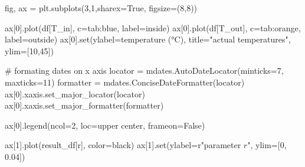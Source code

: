 \documentclass[
  letterpaper,
  DIV=11,
  numbers=noendperiod,
  oneside]{scrreprt}
\newenvironment{Shaded}{\begin{snugshade}}{\end{snugshade}}
\newcommand{\BuiltInTok}[1]{\textcolor[rgb]{0.00,0.23,0.31}{#1}}
\newcommand{\CommentTok}[1]{\textcolor[rgb]{0.37,0.37,0.37}{#1}}
\newcommand{\DecValTok}[1]{\textcolor[rgb]{0.68,0.00,0.00}{#1}}
\newcommand{\FloatTok}[1]{\textcolor[rgb]{0.68,0.00,0.00}{#1}}
\newcommand{\NormalTok}[1]{\textcolor[rgb]{0.00,0.23,0.31}{#1}}
\newcommand{\OperatorTok}[1]{\textcolor[rgb]{0.37,0.37,0.37}{#1}}
\newcommand{\StringTok}[1]{\textcolor[rgb]{0.13,0.47,0.30}{#1}}
\newcommand{\VariableTok}[1]{\textcolor[rgb]{0.07,0.07,0.07}{#1}}
\newcommand{\VerbatimStringTok}[1]{\textcolor[rgb]{0.13,0.47,0.30}{#1}}
\begin{document}
\begin{Shaded}
\begin{Highlighting}[]
\NormalTok{fig, ax }\OperatorTok{=}\NormalTok{ plt.subplots(}\DecValTok{3}\NormalTok{,}\DecValTok{1}\NormalTok{,sharex}\OperatorTok{=}\VariableTok{True}\NormalTok{, figsize}\OperatorTok{=}\NormalTok{(}\DecValTok{8}\NormalTok{,}\DecValTok{8}\NormalTok{))}

\NormalTok{ax[}\DecValTok{0}\NormalTok{].plot(df[}\StringTok{\textquotesingle{}T\_in\textquotesingle{}}\NormalTok{], c}\OperatorTok{=}\StringTok{\textquotesingle{}tab:blue\textquotesingle{}}\NormalTok{, label}\OperatorTok{=}\StringTok{\textquotesingle{}inside\textquotesingle{}}\NormalTok{)}
\NormalTok{ax[}\DecValTok{0}\NormalTok{].plot(df[}\StringTok{\textquotesingle{}T\_out\textquotesingle{}}\NormalTok{], c}\OperatorTok{=}\StringTok{\textquotesingle{}tab:orange\textquotesingle{}}\NormalTok{, label}\OperatorTok{=}\StringTok{\textquotesingle{}outside\textquotesingle{}}\NormalTok{)}
\NormalTok{ax[}\DecValTok{0}\NormalTok{].}\BuiltInTok{set}\NormalTok{(ylabel}\OperatorTok{=}\StringTok{\textquotesingle{}temperature (°C)\textquotesingle{}}\NormalTok{,}
\NormalTok{          title}\OperatorTok{=}\StringTok{"actual temperatures"}\NormalTok{,}
\NormalTok{          ylim}\OperatorTok{=}\NormalTok{[}\DecValTok{10}\NormalTok{,}\DecValTok{45}\NormalTok{])}

\CommentTok{\# formating dates on x axis}
\NormalTok{locator }\OperatorTok{=}\NormalTok{ mdates.AutoDateLocator(minticks}\OperatorTok{=}\DecValTok{7}\NormalTok{, maxticks}\OperatorTok{=}\DecValTok{11}\NormalTok{)}
\NormalTok{formatter }\OperatorTok{=}\NormalTok{ mdates.ConciseDateFormatter(locator)}
\NormalTok{ax[}\DecValTok{0}\NormalTok{].xaxis.set\_major\_locator(locator)}
\NormalTok{ax[}\DecValTok{0}\NormalTok{].xaxis.set\_major\_formatter(formatter)}

\NormalTok{ax[}\DecValTok{0}\NormalTok{].legend(ncol}\OperatorTok{=}\DecValTok{2}\NormalTok{, loc}\OperatorTok{=}\StringTok{\textquotesingle{}upper center\textquotesingle{}}\NormalTok{, frameon}\OperatorTok{=}\VariableTok{False}\NormalTok{)}

\NormalTok{ax[}\DecValTok{1}\NormalTok{].plot(result\_df[}\StringTok{\textquotesingle{}r\textquotesingle{}}\NormalTok{], color}\OperatorTok{=}\StringTok{\textquotesingle{}black\textquotesingle{}}\NormalTok{)}
\NormalTok{ax[}\DecValTok{1}\NormalTok{].}\BuiltInTok{set}\NormalTok{(ylabel}\OperatorTok{=}\VerbatimStringTok{r"parameter $r$"}\NormalTok{,}
\NormalTok{          ylim}\OperatorTok{=}\NormalTok{[}\DecValTok{0}\NormalTok{, }\FloatTok{0.04}\NormalTok{])}


\end{Highlighting}
\end{Shaded}
\end{document}
